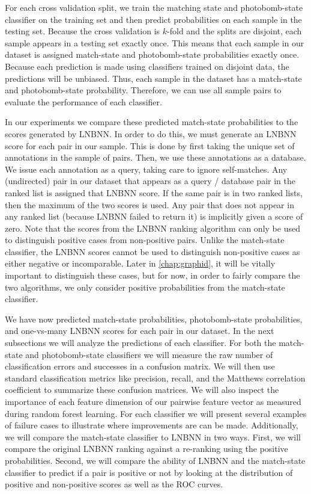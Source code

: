     For each cross validation split, we train the matching state and photobomb-state classifier on the training
      set and then predict probabilities on each sample in the testing set.
    Because the cross validation is $k$-fold and the splits are disjoint, each sample appears in a testing set
      exactly once.
    This means that each sample in our dataset is assigned match-state and photobomb-state probabilities exactly
      once.
    Because each prediction is made using classifiers trained on disjoint data, the predictions will be unbiased.
    Thus, each sample in the dataset has a match-state and photobomb-state probability.
    Therefore, we can use all sample pairs to evaluate the performance of each classifier.

    In our experiments we compare these predicted match-state probabilities to the scores generated by LNBNN.
    In order to do this, we must generate an LNBNN score for each pair in our sample.
    This is done by first taking the unique set of annotations in the sample of pairs.
    Then, we use these annotations as a database.
    We issue each annotation as a query, taking care to ignore self-matches.
    Any (undirected) pair in our dataset that appears as a query / database pair in the ranked list is assigned
      that LNBNN score.
    If the same pair is in two ranked lists, then the maximum of the two scores is used.
    Any pair that does not appear in any ranked list (because LNBNN failed to return it) is implicitly given a
      score of zero.
    Note that the scores from the LNBNN ranking algorithm can only be used to distinguish positive cases from
      non-positive pairs.
    Unlike the match-state classifier, the LNBNN scores cannot be used to distinguish non-positive cases as
      either negative or incomparable.
    Later in \cref{chap:graphid}, it will be vitally important to distinguish these cases, but for now, in order
      to fairly compare the two algorithms, we only consider positive probabilities from the match-state
      classifier.

    We have now predicted match-state probabilities, photobomb-state probabilities, and one-vs-many LNBNN scores
      for each pair in our dataset.
    In the next subsections we will analyze the predictions of each classifier.
    For both the match-state and photobomb-state classifiers we will measure the raw number of classification
      errors and successes in a confusion matrix.
    We will then use standard classification metrics like precision, recall, and the Matthews correlation
      coefficient to summarize these confusion matrices.
    We will also inspect the importance of each feature dimension of our pairwise feature vector as measured
      during random forest learning.
    For each classifier we will present several examples of failure cases to illustrate where improvements are
      can be made.
    Additionally, we will compare the match-state classifier to LNBNN in two ways.
    First, we will compare the original LNBNN ranking against a re-ranking using the positive probabilities.
    Second, we will compare the ability of LNBNN and the match-state classifier to predict if a pair is positive
      or not by looking at the distribution of positive and non-positive scores as well as the ROC curves.


